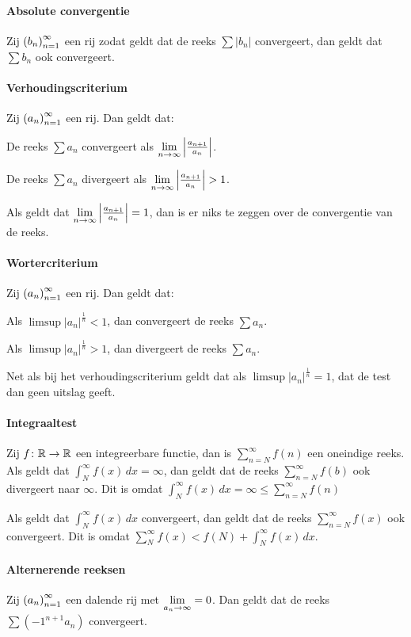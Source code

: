 \paragraph{Absolute convergentie} Zij \(\left(b_{n}\right)_{n=1}^{\infty}\) een rij zodat geldt dat de reeks \(\sum|b_{n}|\) convergeert, dan geldt dat \(\sum b_{n}\) ook convergeert.

\paragraph{Verhoudingscriterium} Zij \(\left(a_{n}\right)_{n=1}^{\infty}\) een rij. Dan geldt dat:
\begin{enum}[i.]
    \item De reeks \(\sum a_{n}\) convergeert als \(\underset{n\to\infty}{\text{lim}}\left|\frac{a_{n+1}}{a_{n}}\right|\).
    \item De reeks \(\sum a_{n}\) divergeert als \(\liminfty{n}\left|\frac{a_{n+1}}{a_{n}}\right|>1\).
    \item Als geldt dat \(\underset{n\to\infty}{\text{lim}}\left|\frac{a_{n+1}}{a_{n}}\right|=1\), dan is er niks te zeggen over de convergentie van de reeks.
\end{enum}

\paragraph{Wortercriterium} Zij \(\left(a_{n}\right)_{n=1}^{\infty}\) een rij. Dan geldt dat:
\begin{enum}[i.]
    \item Als \(\limsup\left|a_{n}\right|^{\frac{1}{n}}<1\), dan convergeert de reeks \(\sum a_{n}\).
    \item Als \(\limsup\left|a_{n}\right|^{\frac{1}{n}}>1\), dan divergeert de reeks \(\sum a_{n}\).
    \item Net als bij het verhoudingscriterium geldt dat als \(\limsup\left|a_{n}\right|^{\frac{1}{n}}=1\), dat de test dan geen uitslag geeft.
\end{enum}

\paragraph{Integraaltest} Zij \(f\colon\mathbb{R}\to\mathbb{R}\) een integreerbare functie, dan is \(\sum_{n=N}^{\infty}f(n)\) een oneindige reeks. Als geldt dat \(\int_{N}^{\infty}f(x)\,dx=\infty\), dan geldt dat de reeks \(\sum_{n=N}^{\infty}f(b)\) ook divergeert naar \(\infty\). Dit is omdat \(\int_{N}^{\infty}f(x)\,dx=\infty\leq\sum_{n=N}^{\infty}f(n)\)

Als geldt dat \(\int_{N}^{\infty}f(x)\,dx\) convergeert, dan geldt dat de reeks \(\sum_{n=N}^{\infty}f(x)\) ook convergeert. Dit is omdat \(\sum_{N}^{\infty}f(x)<f(N)+\int_{N}^{\infty}f(x)\,dx\).

\paragraph{Alternerende reeksen} Zij \(\left(a_{n}\right)_{n=1}^{\infty}\) een dalende rij met \(\underset{a_{n}\to\infty}{\text{lim}}=0\). Dan geldt dat de reeks \(\sum(-1^{n+1}a_{n})\) convergeert.
